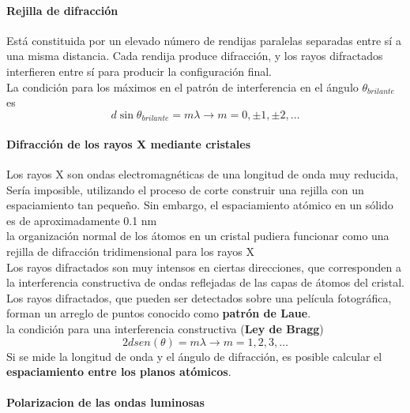 \documentclass[10pt]{article}
\begin{document}
\paragraph{Rejilla de difracción}

Está constituida por un elevado número de rendijas paralelas separadas entre sí a una misma distancia. Cada rendija produce difracción, y los rayos difractados interfieren entre sí para producir la configuración final.\\
\linebreak
La condición para los máximos en el patrón de interferencia en el ángulo $\theta_{brilante}$ es
\begin{equation*}
	d \sin \theta_{brilante} = m\lambda \rightarrow m = 0, \pm 1,\pm 2,\dots
\end{equation*}
\paragraph{Difracción de los rayos X mediante cristales}
Los rayos X son ondas electromagnéticas de una longitud de onda muy reducida, Sería imposible, utilizando el proceso de corte 
construir una rejilla con un espaciamiento tan pequeño. Sin embargo, el espaciamiento atómico en un sólido es de aproximadamente 0.1 nm\\
la organización normal de los átomos en un cristal pudiera funcionar como una rejilla de difracción tridimensional para los rayos X\\
Los rayos difractados son muy intensos en ciertas direcciones, que corresponden a la interferencia constructiva de ondas reflejadas de las capas de átomos del cristal. Los rayos difractados, que pueden ser detectados sobre una película fotográfica,
forman un arreglo de puntos conocido como \textbf{patrón de Laue}.\\
la condición para una interferencia constructiva (\textbf{Ley de Bragg})
\begin{equation*}
	2dsen(\theta) = m\lambda \rightarrow m = 1,2,3,\dots
\end{equation*}
Si se mide la longitud de onda y el ángulo de difracción,
es posible calcular el \textbf{espaciamiento entre los planos atómicos}.

\paragraph{Polarizacion de las ondas luminosas}
\end{document}

